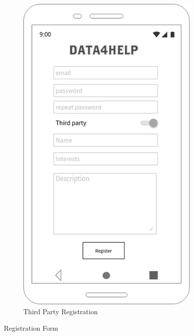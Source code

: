 \begin{figure}[h!]
\begin{subfigure}[b]{0.4\linewidth}
    \includegraphics[width=\linewidth]{img/mockup/tp_registration.jpg}
    \caption{Third Party Registration}
  \end{subfigure}
\caption{Registration Form}
\end{figure}


